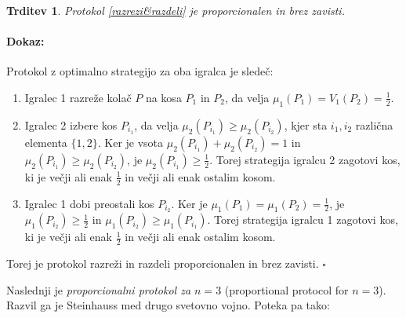 \documentclass[a4paper, 12pt]{article}
\newtheorem{trditev}{Trditev}
\newenvironment{dokaz}{\paragraph{Dokaz:}}{\hfill$\square$\\}
\begin{document}
	\begin{trditev}
		Protokol \ref{razrezi&razdeli} je proporcionalen in brez zavisti.
	\end{trditev}

	\begin{dokaz}
		Protokol z optimalno strategijo za oba igralca je sledeč:
		\begin{enumerate}
			
			\item Igralec 1 razreže kolač $P$ na kosa $P_1$ in $P_2$, da velja $\mu_1 (P_1) = V_1 (P_2) = \frac{1}{2}$.
			
			\item Igralec 2 izbere kos $P_{i_1}$, da velja $\mu_2 (P_{i_1}) \geq \mu_2 (P_{i_2})$, kjer sta $i_1, i_2$ različna elementa $\{1, 2\}$. Ker je vsota $\mu_2 (P_{i_1}) + \mu_2 (P_{i_2}) = 1$ in $\mu_2 (P_{i_1}) \geq \mu_2 (P_{i_2})$, je $\mu_2 (P_{i_1}) \geq \frac{1}{2}$. Torej strategija igralcu 2 zagotovi kos, ki je večji ali enak $\frac{1}{2}$ in večji ali enak ostalim kosom.
			
			\item Igralec 1 dobi preostali kos $P_{i_2}$. Ker je $\mu_1 (P_1) = \mu_1 (P_2) = \frac{1}{2}$, je $\mu_1 (P_{i_2}) \geq \frac{1}{2}$ in $\mu_1 (P_{i_2}) \geq \mu_1 (P_{i_1})$. Torej strategija igralcu 1 zagotovi kos, ki je večji ali enak $\frac{1}{2}$ in večji ali enak ostalim kosom.
			
		\end{enumerate}
	
		Torej je protokol razreži in razdeli proporcionalen in brez zavisti.
	\end{dokaz}

	Naslednji je \textit{proporcionalni protokol za $n = 3$} (proportional protocol for $n=3$). Razvil ga je Steinhauss med drugo svetovno vojno. Poteka pa tako:
	
\end{document}

